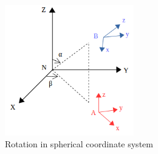 \begin{figure}[h!]
\centering
\includegraphics[width=0.5\textwidth]{./fig/NAB.png}
    \caption{Rotation in spherical coordinate system}
\label{fig:NAB}
\end{figure}

